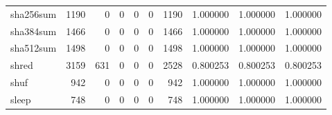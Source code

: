 \begin{tabular}{lrrrrrrrrr}
sha256sum &                                               1190 &                                                  0 &                                                  0 &                                                  0 &                                                  0 &                                               1190 &                                           1.000000 &                               1.000000 &                             1.000000 \\
sha384sum &                                               1466 &                                                  0 &                                                  0 &                                                  0 &                                                  0 &                                               1466 &                                           1.000000 &                               1.000000 &                             1.000000 \\
sha512sum &                                               1498 &                                                  0 &                                                  0 &                                                  0 &                                                  0 &                                               1498 &                                           1.000000 &                               1.000000 &                             1.000000 \\
shred     &                                               3159 &                                                631 &                                                  0 &                                                  0 &                                                  0 &                                               2528 &                                           0.800253 &                               0.800253 &                             0.800253 \\
shuf      &                                                942 &                                                  0 &                                                  0 &                                                  0 &                                                  0 &                                                942 &                                           1.000000 &                               1.000000 &                             1.000000 \\
sleep     &                                                748 &                                                  0 &                                                  0 &                                                  0 &                                                  0 &                                                748 &                                           1.000000 &                               1.000000 &                             1.000000 \\

\end{tabular}
